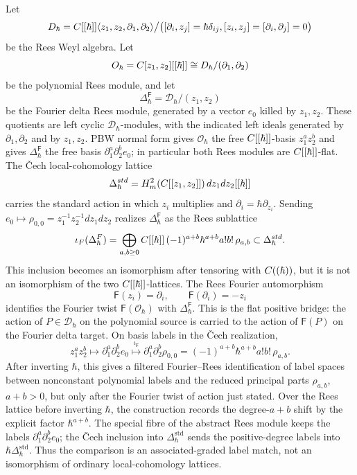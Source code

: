 \begin{thm}
\label{thm:app-matlis-rees-fourier-bridge}
  Let
  \[
    D_\hbar
    =
    C[[\hbar]]
      \langle z_1,z_2,\partial_1,\partial_2\rangle
      \big/
      \bigl([\partial_i,z_j]=\hbar\delta_{ij},
      [z_i,z_j]=[\partial_i,\partial_j]=0\bigr)
  \]
  be the Rees Weyl algebra.  Let
  \[
    O_\hbar=C[z_1,z_2][[\hbar]]
      \cong D_\hbar/(\partial_1,\partial_2)
  \]
  be the polynomial Rees module, and let
  \[
    \Delta^{\mathsf F}_\hbar=
      \mathcal D_\hbar/(z_1,z_2)
  \]
  be the Fourier delta Rees module, generated by a vector \(e_0\)
  killed by \(z_1,z_2\).  These quotients are left cyclic
  \(\mathcal D_\hbar\)-modules, with the indicated left ideals
  generated by \(\partial_1,\partial_2\) and by \(z_1,z_2\). PBW normal
  form gives \(\mathcal O_\hbar\) the free \(C[[\hbar]]\)-basis
  \(z_1^az_2^b\) and gives \(\Delta^{\mathsf F}_\hbar\) the free basis
  \(\partial_1^a\partial_2^b e_0\); in particular both Rees modules are
  \(C[[\hbar]]\)-flat.  The \v{C}ech local-cohomology lattice
  \[
    \Delta^{std}_\hbar=
    H^2_{m}(C[[z_1,z_2]])\,dz_1dz_2[[\hbar]]
  \]
  carries the standard action in which \(z_i\) multiplies and
  \(\partial_i=\hbar\partial_{z_i}\).  Sending
  \(e_0\mapsto\rho_{0,0}=z_1^{-1}z_2^{-1}dz_1dz_2\) realizes
  \(\Delta^{\mathsf F}_\hbar\) as the Rees sublattice
  \[
    \iota_{F}(\Delta^{F}_\hbar)
    =
    \bigoplus_{a,b\geq0}
      C[[\hbar]]\,
      (-1)^{a+b}\hbar^{a+b}a!b!\,\rho_{a,b}
    \subset
    \Delta^{std}_\hbar .
  \]
  This inclusion becomes an isomorphism after tensoring with
  \(C((\hbar))\), but it is not an isomorphism of the two
  \(C[[\hbar]]\)-lattices.  The Rees Fourier
  automorphism
  \[
    \mathsf F(z_i)=\partial_i,\qquad
    \mathsf F(\partial_i)=-z_i
  \]
  identifies the Fourier twist \(\mathsf F(\mathcal O_\hbar)\) with
  \(\Delta^{\mathsf F}_\hbar\).  This is the flat positive bridge: the
  action of \(P\in\mathcal D_\hbar\) on the polynomial source is carried
  to the action of \(\mathsf F(P)\) on the Fourier delta target.  On basis
  labels in the \v{C}ech
  realization,
  \[
    z_1^az_2^b
    \longmapsto
    \partial_1^a\partial_2^b e_0
    \overset{\iota_{\mathsf F}}{\longmapsto}
    \partial_1^a\partial_2^b\rho_{0,0}
    =
    (-1)^{a+b}\hbar^{a+b}a!b!\,\rho_{a,b}.
  \]
  After inverting \(\hbar\), this gives a filtered Fourier--Rees
  identification of label spaces between nonconstant polynomial labels and
  the reduced principal parts \(\rho_{a,b}\), \(a+b>0\), but only after the
  Fourier twist of action just stated.  Over the Rees lattice before
  inverting \(\hbar\), the construction records the degree-\(a+b\) shift
  by the explicit factor \(\hbar^{a+b}\).  The special fibre of the
  abstract Rees module keeps the labels
  \(\partial_1^a\partial_2^be_0\); the \v{C}ech inclusion into
  \(\Delta^{\mathrm{std}}_\hbar\) sends the positive-degree labels into
  \(\hbar\Delta^{\mathrm{std}}_\hbar\).  Thus the comparison is an
  associated-graded label match, not an isomorphism of ordinary
  local-cohomology lattices.


\end{thm}
